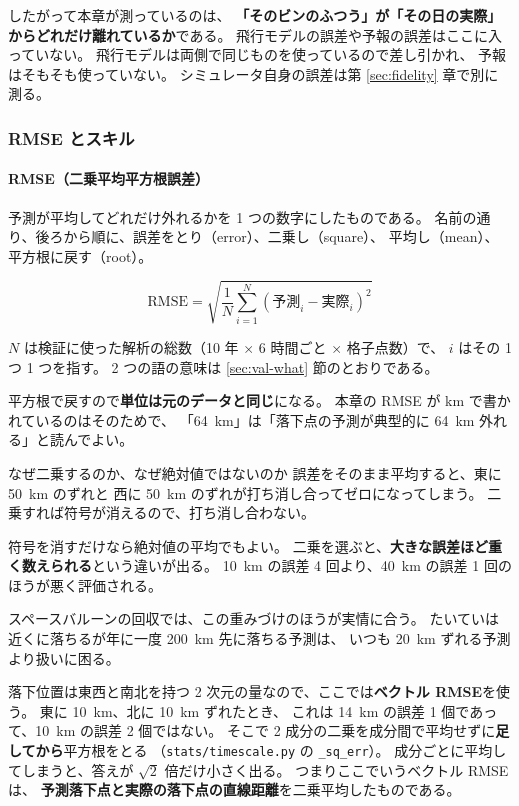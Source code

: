 したがって本章が測っているのは、
\textbf{「そのビンのふつう」が「その日の実際」からどれだけ離れているか}である。
飛行モデルの誤差や予報の誤差はここに入っていない。
飛行モデルは両側で同じものを使っているので差し引かれ、
予報はそもそも使っていない。
シミュレータ自身の誤差は第 \ref{sec:fidelity} 章で別に測る。

\subsubsection{RMSE とスキル}

\paragraph{RMSE（二乗平均平方根誤差）}
予測が平均してどれだけ外れるかを 1 つの数字にしたものである。
名前の通り、後ろから順に、誤差をとり（error）、二乗し（square）、
平均し（mean）、平方根に戻す（root）。

\begin{equation}
\mathrm{RMSE} = \sqrt{\frac{1}{N}\sum_{i=1}^{N}\left(\text{予測}_i - \text{実際}_i\right)^2}
\label{eq:rmse}
\end{equation}

$N$ は検証に使った解析の総数（10 年 $\times$ 6 時間ごと $\times$ 格子点数）で、
$i$ はその 1 つ 1 つを指す。
2 つの語の意味は \ref{sec:val-what} 節のとおりである。

平方根で戻すので\textbf{単位は元のデータと同じ}になる。
本章の RMSE が \si{\kilo\metre} で書かれているのはそのためで、
「\SI{64}{\kilo\metre}」は「落下点の予測が典型的に \SI{64}{\kilo\metre} 外れる」と読んでよい。

\begin{whybox}{なぜ二乗するのか、なぜ絶対値ではないのか}
誤差をそのまま平均すると、東に \SI{50}{\kilo\metre} のずれと
西に \SI{50}{\kilo\metre} のずれが打ち消し合ってゼロになってしまう。
二乗すれば符号が消えるので、打ち消し合わない。

符号を消すだけなら絶対値の平均でもよい。
二乗を選ぶと、\textbf{大きな誤差ほど重く数えられる}という違いが出る。
\SI{10}{\kilo\metre} の誤差 4 回より、\SI{40}{\kilo\metre} の誤差 1 回のほうが悪く評価される。

スペースバルーンの回収では、この重みづけのほうが実情に合う。
たいていは近くに落ちるが年に一度 \SI{200}{\kilo\metre} 先に落ちる予測は、
いつも \SI{20}{\kilo\metre} ずれる予測より扱いに困る。
\end{whybox}

落下位置は東西と南北を持つ 2 次元の量なので、ここでは\textbf{ベクトル RMSE}を使う。
東に \SI{10}{\kilo\metre}、北に \SI{10}{\kilo\metre} ずれたとき、
これは \SI{14}{\kilo\metre} の誤差 1 個であって、\SI{10}{\kilo\metre} の誤差 2 個ではない。
そこで 2 成分の二乗を成分間で平均せずに\textbf{足してから}平方根をとる
（\texttt{stats/timescale.py} の \texttt{\_sq\_err}）。
成分ごとに平均してしまうと、答えが $\sqrt{2}$ 倍だけ小さく出る。
つまりここでいうベクトル RMSE は、
\textbf{予測落下点と実際の落下点の直線距離}を二乗平均したものである。

